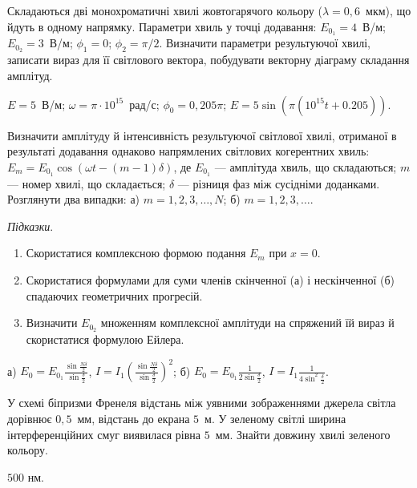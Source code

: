 \begin{problem}%
Складаються дві монохроматичні хвилі жовтогарячого кольору ($\lambda =
	0,6$~мкм), що йдуть в одному напрямку. Параметри хвиль у точці
додавання: $E_{0_1} = 4$~В/м; $E_{0_2} = 3$~В/м; $\phi_1 = 0$; $\phi_2 = \pi/2$. Визначити
параметри результуючої хвилі, записати вираз для її світлового вектора,
побудувати векторну діаграму складання амплітуд.
\begin{solution}
	$ E = 5 $~В/м; $\omega = \pi\cdot10^{15}$~рад/с; $\phi_0 = 0,205\pi$; $ E = 5\sin(\pi(10^{15} t + 0.205)) $.
\end{solution}
\end{problem}


\begin{problem}%
Визначити амплітуду й інтенсивність результуючої світлової хвилі,
отриманої в результаті додавання однаково напрямлених світлових
когерентних хвиль: $E_m = E_{0_1}\cos(\omega t - (m - 1) \delta)$, де $E_{0_1}$ --- амплітуда хвиль, що
складаються; $m$ --- номер хвилі, що складається; $\delta$ --- різниця фаз між
сусідніми доданками. Розглянути два випадки: а) $m = 1, 2, 3, \ldots, N$; б) $m =
	1, 2, 3, \ldots$.
\begin{solution}
	\emph{Підказки}.
	\begin{enumerate}
		\item  Скористатися комплексною формою подання $E_m$ при $x = 0$.
		\item  Скористатися формулами для суми членів скінченної (а) і нескінченної (б) спадаючих
		      геометричних прогресій.
		\item  Визначити $ E_{0_2} $ множенням комплексної амплітуди на спряжений їй вираз й
		      скористатися формулою Ейлера.
	\end{enumerate}
	а) $ E_0 = E_{0_1} \frac{\sin\frac{N\delta}{2}}{\sin\frac{\delta}{2}} $, $ I = I_1 \left( \frac{\sin\frac{N\delta}{2}}{\sin\frac{\delta}{2}}\right)^2 $; б) $ E_0 = E_{0_1} \frac1{2\sin\frac{\delta}{2}} $, $ I = I_1 \frac1{4\sin^2\frac{\delta}{2}} $.
\end{solution}
\end{problem}


\begin{problem}%
У схемі біпризми Френеля відстань між уявними зображеннями
джерела світла дорівнює $0,5$~мм, відстань до екрана $5$~м. У зеленому
світлі ширина інтерференційних смуг виявилася рівна $5$~мм. Знайти
довжину хвилі зеленого кольору.
\begin{solution}
	$ 500 $ нм.
\end{solution}
\end{problem}



